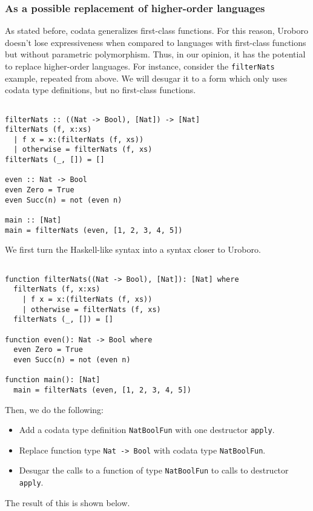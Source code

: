 \subsubsection{As a possible replacement of higher-order languages}

As stated before, codata generalizes first-class functions. For this reason, Uroboro doesn't lose expressiveness when compared to languages with first-class functions but without parametric polymorphism. Thus, in our opinion, it has the potential to replace higher-order languages. For instance, consider the \texttt{filterNats} example, repeated from above. We will desugar it to a form which only uses codata type definitions, but no first-class functions.

\begin{lstlisting}

filterNats :: ((Nat -> Bool), [Nat]) -> [Nat]
filterNats (f, x:xs)
  | f x = x:(filterNats (f, xs))
  | otherwise = filterNats (f, xs)
filterNats (_, []) = []

even :: Nat -> Bool
even Zero = True
even Succ(n) = not (even n)

main :: [Nat]
main = filterNats (even, [1, 2, 3, 4, 5])

\end{lstlisting}

We first turn the Haskell-like syntax into a syntax closer to Uroboro.

\begin{lstlisting}

function filterNats((Nat -> Bool), [Nat]): [Nat] where
  filterNats (f, x:xs)
    | f x = x:(filterNats (f, xs))
    | otherwise = filterNats (f, xs)
  filterNats (_, []) = []

function even(): Nat -> Bool where
  even Zero = True
  even Succ(n) = not (even n)

function main(): [Nat]
  main = filterNats (even, [1, 2, 3, 4, 5])

\end{lstlisting}

Then, we do the following:
\begin{itemize}
\item Add a codata type definition \texttt{NatBoolFun} with one destructor \texttt{apply}.

\item Replace function type \texttt{Nat -> Bool} with codata type \texttt{NatBoolFun}.

\item Desugar the calls to a function of type \texttt{NatBoolFun} to calls to destructor \texttt{apply}.
\end{itemize}
The result of this is shown below.

